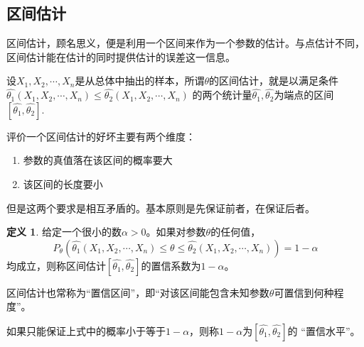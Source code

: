 \documentclass[a4paper,11pt]{article}%
\theoremstyle{remark}
\theoremstyle{remark}
\theoremstyle{definition}
\theoremstyle{definition}
\newtheorem*{definition}{定义}
\theoremstyle{plain}
\begin{document}
\subsection{区间估计}
区间估计，顾名思义，便是利用一个区间来作为一个参数的估计。与点估计不同，区间估计能在估计的同时提供估计的误差这一信息。

设$X_1,X_2,\cdots,X_n$是从总体中抽出的样本，所谓$\theta$的区间估计，就是以满足条件$\hat{\theta_1} (X_1,X_2,\cdots,X_n)\leq \hat{\theta_2} (X_1,X_2,\cdots,X_n)$
的两个统计量$\hat{\theta_1},\hat{\theta_2}$为端点的区间$[\hat{\theta_1},\hat{\theta_2}]$.

评价一个区间估计的好坏主要有两个维度：
\begin{enumerate}
    \item 参数的真值落在该区间的概率要大
    \item 该区间的长度要小
\end{enumerate}
但是这两个要求是相互矛盾的。基本原则是先保证前者，在保证后者。


\begin{definition}
    给定一个很小的数$\alpha>0$。如果对参数$\theta$的任何值，
    \[P_{\theta}(\hat{\theta_1}  (X_1,X_2,\cdots,X_n)\leq\theta\leq\hat{\theta_2}(X_1,X_2,\cdots,X_n))=1-\alpha\]
    均成立，则称区间估计$[\hat{\theta_1},\hat{\theta_2}]$的置信系数为$1-\alpha$。
\end{definition}
区间估计也常称为“置信区间”，即“对该区间能包含未知参数$\theta$可置信到何种程度”。

如果只能保证上式中的概率小于等于$1-\alpha$，则称$1-\alpha$为$[\hat{\theta_1},\hat{\theta_2}]$的 “置信水平”。
\end{document}
